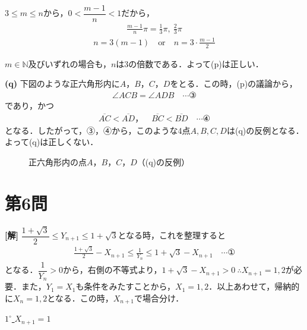 \documentclass[../main.tex]{subfiles}
\begin{document}
$3\le m\le n$から，$0<\dfrac{m-1}n<1$だから，
\begin{align*}
\frac{m-1}n\pi=\frac13\pi,\ \frac23\pi
\end{align*}
\begin{align*}
n=3(m-1)\quad\text{or}\quad n=3\cdot\frac{m-1}2
\end{align*}

$m\in\mathbb N$及びいずれの場合も，$n$は$3$の倍数である．よって(p)は正しい．

\textbf{(q)} 下図のような正六角形内に$A$，$B$，$C$，$D$をとる．この時，(p)の議論から，
\begin{align*}
\angle ACB=\angle ADB\quad\cdots③
\end{align*}
であり，かつ
\begin{align*}
\overline{AC}<\overline{AD}，\quad\overline{BC}<\overline{BD}\quad\cdots④
\end{align*}
となる．したがって，③，④から，このような4点$A,B,C,D$は(q)の反例となる．よって(q)は正しくない．

\begin{figure}[htb]
\centering
{}
\caption{正六角形内の点$A$，$B$，$C$，$D$（(q)の反例）}
\end{figure}

\newpage

\section*{第6問}

{\bf [解]}
$\dfrac{1+\sqrt3}2\le Y_{n+1}\le1+\sqrt3$となる時，これを整理すると
\begin{align*}
\frac{1+\sqrt3}2-X_{n+1}\le\frac1{Y_n}\le1+\sqrt3-X_{n+1}\quad\cdots①
\end{align*}
となる．$\dfrac1{Y_n}>0$から，右側の不等式より，$1+\sqrt3-X_{n+1}>0\ \therefore X_{n+1}=1,2$が必要．また，$Y_1=X_1$も条件をみたすことから，$X_1=1,2$．以上あわせて，帰納的に$X_n=1,2$となる．この時，$X_{n+1}$で場合分け．

\underline{$1^\circ$ $X_{n+1}=1$}
\end{document}
